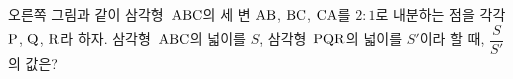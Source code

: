 \noindent\begin{minipage}[t]{0.58\linewidth}\vspace{0pt}\raggedright 오른쪽 그림과 같이 삼각형~$\mathrm{ABC}$의 세 변 $\mathrm{AB}$, $\mathrm{BC}$, $\mathrm{CA}$를 $2:1$로 내분하는 점을 각각 $\mathrm{P}$, $\mathrm{Q}$, $\mathrm{R}$라 하자. 삼각형~$\mathrm{ABC}$의 넓이를 $S$, 삼각형~$\mathrm{PQR}$의 넓이를 $S'$이라 할 때, $\dfrac{S}{S'}$의 값은?\end{minipage}\hfill\begin{minipage}[t]{0.4\linewidth}\vspace{0pt}\centering \resizebox{\ifdim\width>\linewidth\linewidth\else\width\fi}{!}{}\end{minipage}\par
{}
